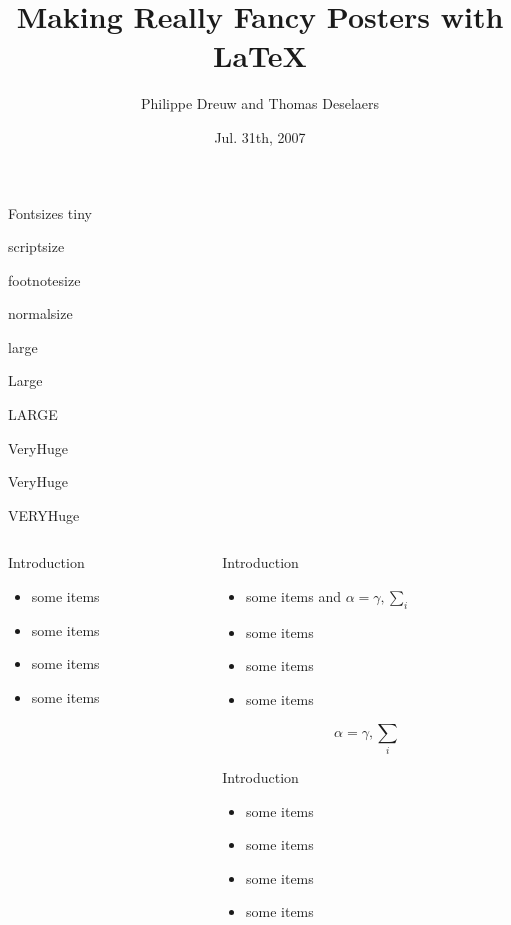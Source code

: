 \documentclass[final]{beamer}
\title[Fancy Posters]{Making Really Fancy Posters with \LaTeX}
\author[Dreuw \& Deselaers]{Philippe Dreuw and Thomas Deselaers}
\institute[RWTH Aachen University]{Human Language Technology and Pattern Recognition, RWTH Aachen University}
\date{Jul. 31th, 2007}
\begin{document}
\begin{frame}{} 
  \vfill
  \begin{block}{\large Fontsizes}
    \centering
    {\tiny tiny}\par
    {\scriptsize scriptsize}\par
    {\footnotesize footnotesize}\par
    {\normalsize normalsize}\par
    {\large large}\par
    {\Large Large}\par
    {\LARGE LARGE}\par
    {\veryHuge VeryHuge}\par
    {\VeryHuge VeryHuge}\par
    {\VERYHuge VERYHuge}\par
  \end{block}
  \vfill
  \begin{columns}[t]
    \begin{column}{.48\linewidth}
      \begin{block}{Introduction}
        \begin{itemize}
        \item some items
        \item some items
        \item some items
        \item some items
        \end{itemize}
      \end{block}
    \end{column}
    \begin{column}{.48\linewidth}
      \begin{block}{Introduction}
        \begin{itemize}
        \item some items and $\alpha=\gamma, \sum_{i}$
        \item some items
        \item some items
        \item some items
        \end{itemize}
        $$\alpha=\gamma, \sum_{i}$$
      \end{block}
      \begin{block}{Introduction}
        \begin{itemize}
        \item some items
        \item some items
        \item some items
        \item some items
        \end{itemize}
      \end{block}


\end{column}
\end{columns}
\end{frame}
\end{document}
